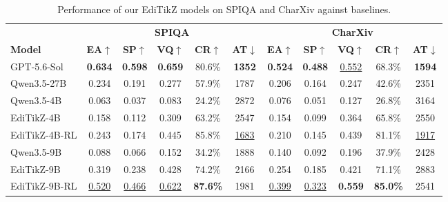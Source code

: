 \begin{table}[t]
\centering
\caption{Performance of our EdiTikZ models on SPIQA and CharXiv against baselines.}
\label{tab:ood_table}
\setlength{\tabcolsep}{4pt}
\begin{tabular}{lccccc|ccccc}
\toprule
&
\multicolumn{5}{c}{\textbf{SPIQA}}
&
\multicolumn{5}{c}{\textbf{CharXiv}}
\\
\cmidrule(lr){2-6}
\cmidrule(lr){7-11}

\textbf{Model}
&
\textbf{EA}$\uparrow$
&
\textbf{SP}$\uparrow$
&
\textbf{VQ}$\uparrow$
&
\textbf{CR}$\uparrow$
&
\textbf{AT}$\downarrow$
&
\textbf{EA}$\uparrow$
&
\textbf{SP}$\uparrow$
&
\textbf{VQ}$\uparrow$
&
\textbf{CR}$\uparrow$
&
\textbf{AT}$\downarrow$
\\
\midrule

GPT-5.6-Sol
& \textbf{0.634}
& \textbf{0.598}
& \textbf{0.659}
& 80.6\%
& \textbf{1352}
& \textbf{0.524}
& \textbf{0.488}
& \underline{0.552}
& 68.3\%
& \textbf{1594}
\\

\midrule

Qwen3.5-27B
& 0.234
& 0.191
& 0.277
& 57.9\%
& 1787
& 0.206
& 0.164
& 0.247
& 42.6\%
& 2351
\\

\midrule

Qwen3.5-4B
& 0.063
& 0.037
& 0.083
& 24.2\%
& 2872
& 0.076
& 0.051
& 0.127
& 26.8\%
& 3164
\\

EdiTikZ-4B
& 0.158
& 0.112
& 0.309
& 63.2\%
& 2547
& 0.154
& 0.099
& 0.364
& 65.8\%
& 2550
\\

EdiTikZ-4B-RL
& 0.243
& 0.174
& 0.445
& 85.8\%
& \underline{1683}
& 0.210
& 0.145
& 0.439
& 81.1\%
& \underline{1917}
\\

\midrule

Qwen3.5-9B
& 0.088
& 0.066
& 0.152
& 34.2\%
& 1888
& 0.140
& 0.092
& 0.196
& 37.9\%
& 2428
\\

EdiTikZ-9B
& 0.319
& 0.238
& 0.428
& 74.2\%
& 2166
& 0.254
& 0.185
& 0.421
& 71.1\%
& 2883
\\

EdiTikZ-9B-RL
& \underline{0.520}
& \underline{0.466}
& \underline{0.622}
& \textbf{87.6\%}
& 1981
& \underline{0.399}
& \underline{0.323}
& \textbf{0.559}
& \textbf{85.0\%}
& 2541
\\

\bottomrule
\end{tabular}
\end{table}